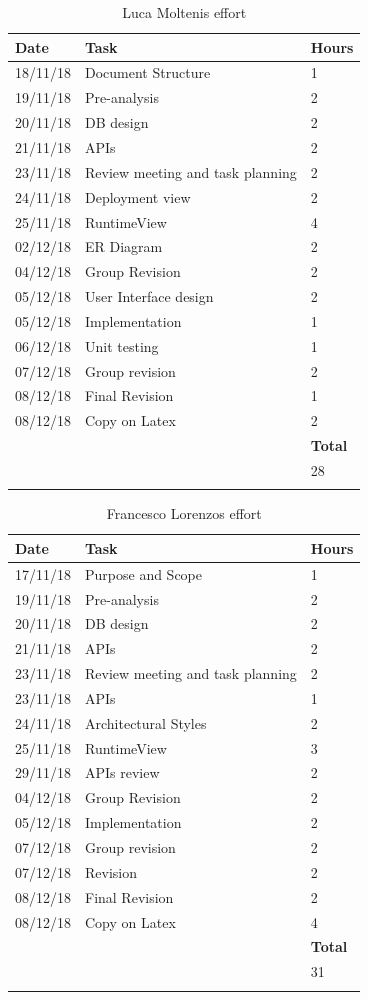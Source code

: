\documentclass[titlepage]{article}
\begin{document}
	\begin{longtable}{| p{2 cm} | p{5 cm} | p{2 cm} |} 
		\hline
		{\bf Date} & {\bf Task} & {\bf Hours}\\
		\hline
		18/11/18 & Document Structure & 1 \\
		19/11/18 & Pre-analysis & 2 \\
		20/11/18 & DB design & 2 \\
		21/11/18 & APIs & 2 \\
		23/11/18 & Review meeting and task planning & 2 \\
		24/11/18 & Deployment view & 2 \\
		25/11/18 & RuntimeView & 4 \\
		02/12/18 & ER Diagram & 2 \\
		04/12/18 & Group Revision & 2\\
		05/12/18 & User Interface design & 2\\
		05/12/18 & Implementation & 1\\
		06/12/18 & Unit testing & 1\\
		07/12/18 & Group revision & 2 \\
		08/12/18 & Final Revision & 1 \\
		08/12/18 & Copy on Latex & 2 \\
		\hline
		& & {\bf Total} \\
		\hline
		& & 28 \\
		\hline
		\caption{Luca Molteni\textsc{\char13}s effort}
	\end{longtable}
	
	\begin{longtable}{| p{2 cm} | p{5 cm} | p{2 cm} |} 
		\hline
		{\bf Date} & {\bf Task} & {\bf Hours}\\
		\hline
		17/11/18 & Purpose and Scope & 1 \\
		19/11/18 & Pre-analysis & 2 \\
		20/11/18 & DB design & 2 \\
		21/11/18 & APIs & 2 \\
		23/11/18 & Review meeting and task planning & 2 \\
		23/11/18 & APIs & 1 \\
		24/11/18 & Architectural Styles & 2 \\
		25/11/18 & RuntimeView & 3 \\
		29/11/18 & APIs review & 2 \\
		04/12/18 & Group Revision & 2 \\
		05/12/18 & Implementation & 2 \\
		07/12/18 & Group revision & 2 \\
		07/12/18 & Revision & 2 \\
		08/12/18 & Final Revision & 2 \\
		08/12/18 & Copy on Latex & 4 \\
		\hline
		& & {\bf Total} \\
		\hline
		& & 31 \\
		\hline
		\caption{Francesco Lorenzo\textsc{\char13}s effort}
	\end{longtable}
	
	
	\pagebreak
	
	
\end{document}
